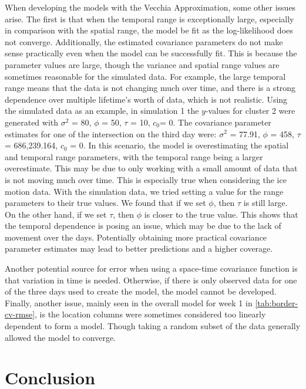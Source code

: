 \documentclass[12pt]{article}
\begin{document}
When developing the models with the Vecchia Approximation, some other
issues arise. The first is that when the temporal range is exceptionally
large, especially in comparison with the spatial range, the model be fit
as the log-likelihood does not converge. Additionally, the estimated
covariance parameters do not make sense practically even when the model
can be successfully fit. This is because the parameter values are large,
though the variance and spatial range values are sometimes reasonable
for the simulated data. For example, the large temporal range means that
the data is not changing much over time, and there is a strong
dependence over multiple lifetime's worth of data, which is not
realistic. Using the simulated data as an example, in simulation 1 the
\(y\)-values for cluster 2 were generated with \(\sigma^2\) = 80,
\(\phi\) = 50, \(\tau\) = 10, \(c_0\)= 0. The covariance parameter
estimates for one of the intersection on the third day were:
\(\sigma^2\) = 77.91, \(\phi\) = 458, \(\tau\) = 686,239.164, \(c_0\) =
0. In this scenario, the model is overestimating the spatial and
temporal range parameters, with the temporal range being a larger
overestimate. This may be due to only working with a small amount of
data that is not moving much over time. This is especially true when
considering the ice motion data. With the simulation data, we tried
setting a value for the range parameters to their true values. We found
that if we set \(\phi\), then \(\tau\) is still large. On the other
hand, if we set \(\tau\), then \(\phi\) is closer to the true value.
This shows that the temporal dependence is posing an issue, which may be
due to the lack of movement over the days. Potentially obtaining more
practical covariance parameter estimates may lead to better predictions
and a higher coverage.

Another potential source for error when using a space-time covariance
function is that variation in time is needed. Otherwise, if there is
only observed data for one of the three days used to create the model,
the model cannot be developed. Finally, another issue, mainly seen in
the overall model for week 1 in \cref{tab:border-cv-rmse}, is the
location columns were sometimes considered too linearly dependent to
form a model. Though taking a random subset of the data generally
allowed the model to converge.

\hypertarget{conclusion}{%
\section{Conclusion}\label{conclusion}}
\end{document}
